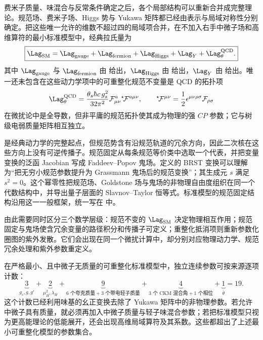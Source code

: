 费米子质量、味混合与反常条件确定之后，各个局部结构可以重新合并成完整理论。规范场、费米子场、Higgs 势与 Yukawa 矩阵都已经由表示与局域对称性分别确定。把这些唯一允许的维数不超过四的局域项合并，在不加入右手中微子场和高维算符的最小标准模型中，经典拉氏量为
\begin{equation}
 \boxed{
 \Lag_{\rm SM}
 =\Lag_{\rm gauge}
 +\Lag_{\rm fermion}
 +\Lag_{\rm Higgs}
 +\Lag_Y
 +\Lag_{\theta}^{\rm QCD}.}
 \label{eq:sm-full-lagrangian-blocks-dp11}
\end{equation}
其中 $\Lag_{\rm gauge}$ 与 $\Lag_{\rm fermion}$ 由  给出，$\Lag_{\rm Higgs}$ 由  给出，$\Lag_Y$ 由  给出。唯一还未包含在这些动力学项中的可重整化规范不变量是 QCD 的拓扑项
\begin{equation}
 \Lag_{\theta}^{\rm QCD}
 =\frac{\theta_s\hbar c\,g_s^2}{32\pi^2}
 \mathcal F_{\mu\nu}^a{}^\star\!\mathcal F^{a\mu\nu},
 \qquad
 {}^\star\!\mathcal F^{\mu\nu}
 =\frac12\epsilon^{\mu\nu\rho\sigma}\mathcal F_{\rho\sigma}
 \label{eq:qcd-theta-term-sm-dp11}
\end{equation}
在微扰论中是全导数，但非平庸的规范拓扑使其成为物理的强 $CP$ 参数；它与树级电弱质量矩阵相互独立。

 是经典动力学的完整起点，但规范势含有沿规范轨道的冗余方向，因此二次核在这些方向上没有可逆传播子。规范固定从每条规范等价类中选取一个代表，并把变量变换的泛函 Jacobian 写成 Faddeev--Popov 鬼场。定义的 BRST 变换可以理解为“把无穷小规范参数提升为 Grassmann 鬼场后的规范变换”；其生成元 $s$ 满足 $s^2=0$。这个幂零性把规范场、Goldstone 场与鬼场的非物理自由度组织在同一个代数结构中，并导出量子层面的 Slavnov--Taylor 恒等式。标准模型的规范固定结构沿用这一一般框架，统一写在 中。

由此需要同时区分三个数学层级：规范不变的 $\Lag_{\rm SM}$ 决定物理相互作用；规范固定与鬼场使含冗余变量的路径积分和传播子可定义；重整化抵消项则重新参数化圈图的紫外发散。它们会出现在同一个微扰计算中，却分别对应物理动力学、规范冗余处理和紫外参数重定义。


\begin{proposition}[最小可重整化标准模型的参数集合]
在严格最小、且中微子无质量的可重整化标准模型中，独立连续参数可按来源逐项计数：
\begin{equation}
 \underbrace{3}_{g_s,g,g'}
 +\underbrace{2}_{\mu_H^2,\lambda_H}
 +\underbrace{9}_{6\text{ 个夸克质量}+3\text{ 个带电轻子质量}}
 +\underbrace{4}_{3\text{ 个 CKM 混合角}+1\text{ 个相位}}
 +\underbrace{1}_{\bar\theta}
 =\boxed{19}.
 \label{eq:minimal-sm-parameter-count-dp11}
\end{equation}
这个计数已经利用味基的幺正变换去除了 Yukawa 矩阵中的非物理参数。若允许中微子具有质量，就必须再加入中微子质量与轻子味混合参数；若把标准模型只视为更高能理论的低能展开，还会出现高维局域算符及其系数。这些都超出了上述最小可重整化模型的参数集合。
\end{proposition}

